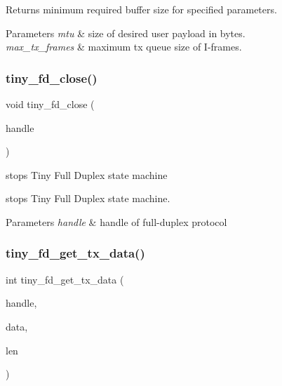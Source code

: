 Returns minimum required buffer size for specified parameters. 
\begin{DoxyParams}{Parameters}
{\em mtu} & size of desired user payload in bytes. \\
\hline
{\em max\+\_\+tx\+\_\+frames} & maximum tx queue size of I-\/frames. \\
\hline
\end{DoxyParams}
\mbox{\label{group__FULL__DUPLEX__API_ga11e470503e3359bc29a5bcb65a9771d5}} 
\subsubsection{\texorpdfstring{tiny\+\_\+fd\+\_\+close()}{tiny\_fd\_close()}}
{\footnotesize\ttfamily void tiny\+\_\+fd\+\_\+close (\begin{DoxyParamCaption}\item[{\hyperlink{group__FULL__DUPLEX__API_ga91e6b79431fe38570fb102701ef0b7e8}{tiny\+\_\+fd\+\_\+handle\+\_\+t}}]{handle }\end{DoxyParamCaption})}



stops Tiny Full Duplex state machine 

stops Tiny Full Duplex state machine.


\begin{DoxyParams}{Parameters}
{\em handle} & handle of full-\/duplex protocol \\
\hline
\end{DoxyParams}
\mbox{\label{group__FULL__DUPLEX__API_ga047059c29688cfcbfd95584e5e435ad2}} 
\subsubsection{\texorpdfstring{tiny\+\_\+fd\+\_\+get\+\_\+tx\+\_\+data()}{tiny\_fd\_get\_tx\_data()}}
{\footnotesize\ttfamily int tiny\+\_\+fd\+\_\+get\+\_\+tx\+\_\+data (\begin{DoxyParamCaption}\item[{\hyperlink{group__FULL__DUPLEX__API_ga91e6b79431fe38570fb102701ef0b7e8}{tiny\+\_\+fd\+\_\+handle\+\_\+t}}]{handle,  }\item[{void $\ast$}]{data,  }\item[{int}]{len }\end{DoxyParamCaption})}




